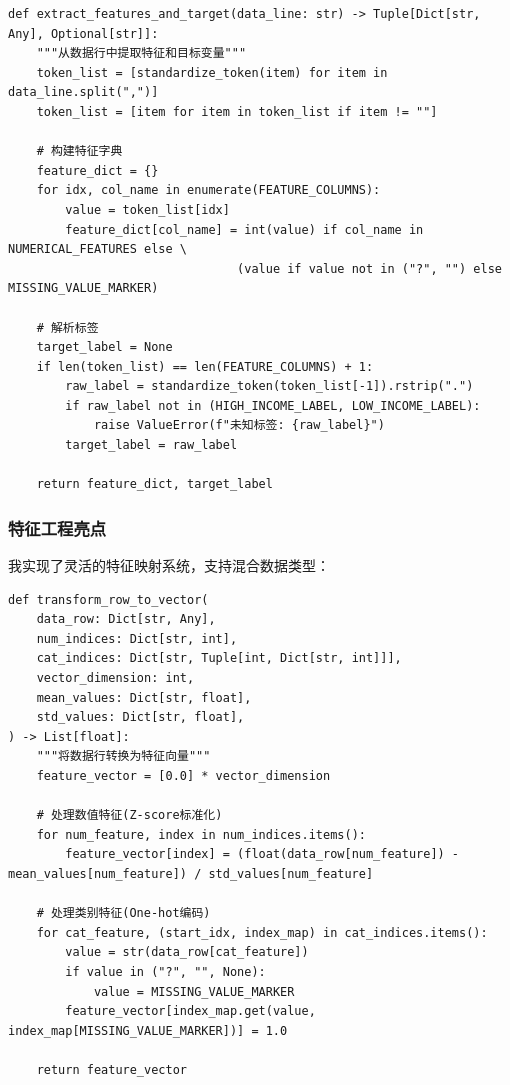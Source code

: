 \documentclass[a4paper]{article}
\begin{document}
\begin{lstlisting}[caption=数据预处理核心函数]
def extract_features_and_target(data_line: str) -> Tuple[Dict[str, Any], Optional[str]]:
    """从数据行中提取特征和目标变量"""
    token_list = [standardize_token(item) for item in data_line.split(",")]
    token_list = [item for item in token_list if item != ""]

    # 构建特征字典
    feature_dict = {}
    for idx, col_name in enumerate(FEATURE_COLUMNS):
        value = token_list[idx]
        feature_dict[col_name] = int(value) if col_name in NUMERICAL_FEATURES else \
                                (value if value not in ("?", "") else MISSING_VALUE_MARKER)

    # 解析标签
    target_label = None
    if len(token_list) == len(FEATURE_COLUMNS) + 1:
        raw_label = standardize_token(token_list[-1]).rstrip(".")
        if raw_label not in (HIGH_INCOME_LABEL, LOW_INCOME_LABEL):
            raise ValueError(f"未知标签: {raw_label}")
        target_label = raw_label

    return feature_dict, target_label
\end{lstlisting}

\subsubsection{特征工程亮点}
我实现了灵活的特征映射系统，支持混合数据类型：

\begin{lstlisting}[caption=特征工程核心实现]
def transform_row_to_vector(
    data_row: Dict[str, Any],
    num_indices: Dict[str, int],
    cat_indices: Dict[str, Tuple[int, Dict[str, int]]],
    vector_dimension: int,
    mean_values: Dict[str, float],
    std_values: Dict[str, float],
) -> List[float]:
    """将数据行转换为特征向量"""
    feature_vector = [0.0] * vector_dimension

    # 处理数值特征(Z-score标准化)
    for num_feature, index in num_indices.items():
        feature_vector[index] = (float(data_row[num_feature]) - mean_values[num_feature]) / std_values[num_feature]

    # 处理类别特征(One-hot编码)
    for cat_feature, (start_idx, index_map) in cat_indices.items():
        value = str(data_row[cat_feature])
        if value in ("?", "", None):
            value = MISSING_VALUE_MARKER
        feature_vector[index_map.get(value, index_map[MISSING_VALUE_MARKER])] = 1.0

    return feature_vector
\end{lstlisting}
\end{document}
